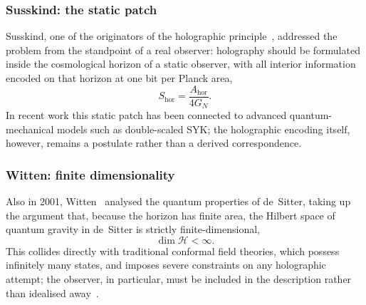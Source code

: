 \subsubsection{Susskind: the static patch}
Susskind, one of the originators of the holographic principle~\cite{Susskind95}, addressed the problem from the
standpoint of a real observer: holography should be formulated inside the cosmological horizon of a static
observer, with all interior information encoded on that horizon at one bit per Planck area,
\begin{equation}
S_{\mathrm{hor}}=\frac{A_{\mathrm{hor}}}{4G_{N}} .
\end{equation}
In recent work this static patch has been connected to advanced quantum-mechanical models such as double-scaled
SYK; the holographic encoding itself, however, remains a postulate rather than a derived correspondence.

\subsubsection{Witten: finite dimensionality}
Also in 2001, Witten~\cite{Witten01dS} analysed the quantum properties of de~Sitter, taking up the argument that,
because the horizon has finite area, the Hilbert space of quantum gravity in de~Sitter is strictly finite-dimensional,
\begin{equation}
\dim\mathcal{H}<\infty .
\end{equation}
This collides directly with traditional conformal field theories, which possess infinitely many states, and
imposes severe constraints on any holographic attempt; the observer, in particular, must be included in the
description rather than idealised away~\cite{CLPW22}.

